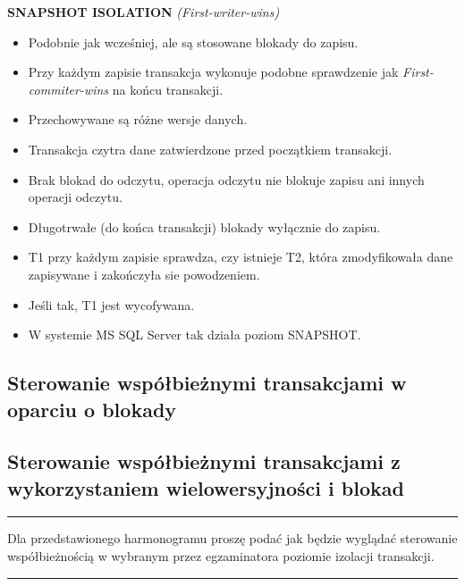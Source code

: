 \documentclass[a5paper,6pt]{article}
\newcommand{\horrule}[1]{\rule{\linewidth}{#1}}
\begin{document}
    \textbf{SNAPSHOT ISOLATION} \textit{(First-writer-wins)}\\
    \begin{itemize}
        \item Podobnie jak wcześniej, ale są stosowane blokady do zapisu.
        \item Przy każdym zapisie transakcja wykonuje podobne sprawdzenie jak
              \textit{First-commiter-wins} na końcu transakcji.
        \item Przechowywane są różne wersje danych.
        \item Transakcja czytra dane zatwierdzone przed początkiem transakcji.
        \item Brak blokad do odczytu, operacja odczytu nie blokuje zapisu ani
              innych operacji odczytu.
        \item Długotrwałe (do końca transakcji) blokady wyłącznie do zapisu.
        \item T1 przy każdym zapisie sprawdza, czy istnieje T2, która
              zmodyfikowała dane zapisywane i zakończyła sie powodzeniem.
        \item Jeśli tak, T1 jest wycofywana.
        \item W systemie MS SQL Server tak działa poziom SNAPSHOT.
    \end{itemize}

\pagebreak

    \subsection{Sterowanie współbieżnymi transakcjami w oparciu o blokady}
    \label{sub:sterowanie_wspolbieznymi_blokady}


    \subsection{Sterowanie współbieżnymi transakcjami z wykorzystaniem
    wielowersyjności i blokad} %
    \label{sub:sterowanie_wspolbieznymi_wielowier}

    \horrule{0.5pt}
    Dla przedstawionego harmonogramu proszę podać jak będzie wyglądać sterowanie
    współbieżnością w wybranym przez egzaminatora poziomie izolacji
    transakcji.\\
    \horrule{0.5pt}
\end{document}
